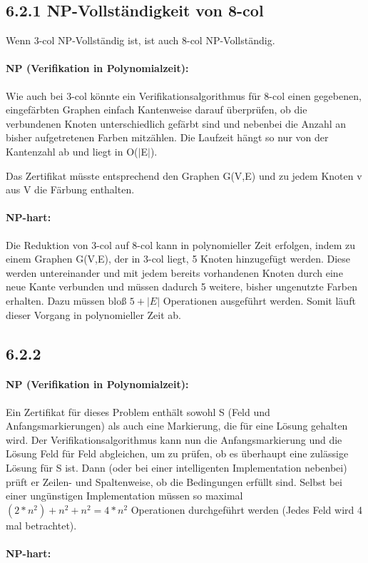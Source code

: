 \subsection*{6.2.1 NP-Vollständigkeit von 8-col}

Wenn 3-col NP-Vollständig ist, ist auch 8-col NP-Vollständig.

\paragraph{NP (Verifikation in Polynomialzeit):}

Wie auch bei 3-col könnte ein Verifikationsalgorithmus für 8-col einen gegebenen, eingefärbten Graphen einfach Kantenweise darauf überprüfen, ob die verbundenen Knoten unterschiedlich gefärbt sind und nebenbei die Anzahl an bisher aufgetretenen Farben mitzählen. Die Laufzeit hängt so nur von der Kantenzahl ab und liegt in O($|$E$|$).

Das Zertifikat müsste entsprechend den Graphen G(V,E) und zu jedem Knoten v aus V die Färbung enthalten.

\paragraph{NP-hart:}

Die Reduktion von 3-col auf 8-col kann in polynomieller Zeit erfolgen, indem zu einem Graphen G(V,E), der in 3-col liegt, 5 Knoten hinzugefügt werden. Diese werden untereinander und mit jedem bereits vorhandenen Knoten durch eine neue Kante verbunden und müssen dadurch 5 weitere, bisher ungenutzte Farben erhalten. Dazu müssen bloß $5 + |E|$ Operationen ausgeführt werden. Somit läuft dieser Vorgang in polynomieller Zeit ab.

\subsection*{6.2.2 }

\paragraph{NP (Verifikation in Polynomialzeit):}

Ein Zertifikat für dieses Problem enthält sowohl S (Feld und Anfangsmarkierungen) als auch eine Markierung, die für eine Lösung gehalten wird. Der Verifikationsalgorithmus kann nun die Anfangsmarkierung und die Lösung Feld für Feld abgleichen, um zu prüfen, ob es überhaupt eine zulässige Lösung für S ist. Dann (oder bei einer intelligenten Implementation nebenbei) prüft er Zeilen- und Spaltenweise, ob die Bedingungen erfüllt sind. Selbst bei einer ungünstigen Implementation müssen so maximal $(2 * n^2) + n^2 + n^2 = 4*n^2$ Operationen durchgeführt werden (Jedes Feld wird 4 mal betrachtet).

\paragraph{NP-hart:}

